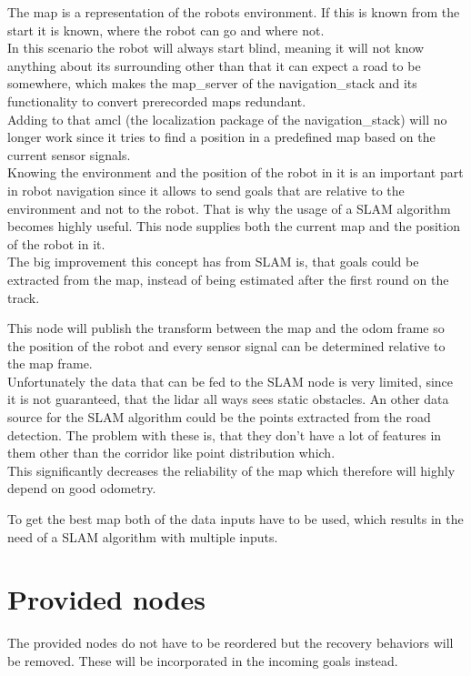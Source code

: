 The map is a representation of the robots environment. If this is known from the start it is known, where the robot can go and where not.\\
 In this scenario the robot will always start blind, meaning it will not know anything about its surrounding other than that it can expect a road to be somewhere, which makes the map\_server of the navigation\_stack and its functionality to convert prerecorded maps redundant.\\
Adding to that amcl (the localization package of the navigation\_stack) will no longer work since it tries to find a position in a predefined map based on the current sensor signals.\\
Knowing the environment and the position of the robot in it is an important part in robot navigation since it allows to send goals that are relative to the environment and not to the robot. That is why the usage of a SLAM algorithm becomes highly useful. This node supplies both the current map and the position of the robot in it.\\
The big improvement this concept has from SLAM is, that goals could be extracted from the map, instead of being estimated after the first round on the track.

This node will publish the transform between the map and the odom frame so the position of the robot and every sensor signal can be determined relative to the map frame.\\

Unfortunately the data that can be fed to the SLAM node is very limited, since it is not guaranteed, that the lidar all ways sees static obstacles. An other data source for the SLAM algorithm could be the points extracted from the road detection. The problem with these is, that they don't have a lot of features in them other than the corridor like point distribution which.\\

This significantly decreases the reliability of the map which therefore will highly depend on good odometry.

To get the best map both of the data inputs have to be used, which results in the need of a SLAM algorithm with multiple inputs.\\

\section{Provided nodes}

The provided nodes do not have to be reordered but the recovery behaviors will be removed. These will be incorporated in the incoming goals instead.

